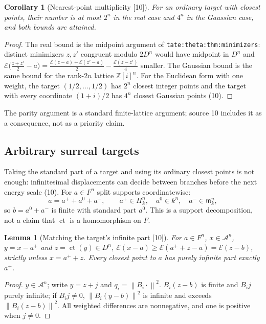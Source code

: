 \documentclass[11pt,oneside]{article}
\numberwithin{equation}{section}
\newtheorem{lemma}[lemma]{Lemma}
\newtheorem{corollary}[corollary]{Corollary}
\theoremstyle{definition}
\theoremstyle{remark}
\newcommand{\Z}{\mathbb Z}
\newcommand{\A}{\mathcal A}
\newcommand{\cE}{\mathcal E}
\newcommand{\mm}{\mathfrak m}
\newcommand{\ct}{\operatorname{ct}}
\newcommand{\norm}[1]{\left\lVert #1\right\rVert}
\newcommand{\src}[1]{\textup{\textsf{\small[#1]}}}
\newcommand{\replabel}[1]{\nolinkurl{#1}}
\begin{document}
\begin{corollary}[Nearest-point multiplicity \src{10}]\label{ogl:lat:cor:parity}
For an ordinary target with closest points, their number is at most $2^n$ in
the real case and $4^n$ in the Gaussian case, and both bounds are attained.
\end{corollary}
\begin{proof}
The real bound is the midpoint argument of \replabel{tate:theta:thm:minimizers}:
distinct minimizers $z,z'$ congruent modulo $2D^n$ would have midpoint in $D^n$
and $\cE\bigl(\frac{z+z'}2-a\bigr)=\frac{\cE(z-a)+\cE(z'-a)}2-\frac{\cE(z-z')}4$
smaller. The Gaussian bound is the same bound for the rank-$2n$ lattice
$\Z[i]^n$. For the Euclidean form with one weight, the target
$(1/2,\dots,1/2)$ has $2^n$ closest integer points and the target with every
coordinate $(1+i)/2$ has $4^n$ closest Gaussian points (10).
\end{proof}

The parity argument is a standard finite-lattice argument; source 10 includes
it as a consequence, not as a priority claim.

\subsection{Arbitrary surreal targets}

Taking the standard part of a target and using its ordinary closest points is not
enough: infinitesimal displacements can decide between branches before the next
energy scale (10). For $a\in F^n$ split supports coordinatewise:
\begin{equation}\label{ogl:lat:eq:targetsplit}
 a=a^++a^0+a^-,\qquad a^+\in\Pi_k^n,\quad a^0\in k^n,\quad a^-\in\mm_k^n,
\end{equation}
so $b=a^0+a^-$ is finite with standard part $a^0$. This is a support
decomposition, not a claim that $\ct$ is a homomorphism on $F$.

\begin{lemma}[Matching the target's infinite part \src{10}]\label{ogl:lat:lem:finitetarget}
For $a\in F^n$, $x\in\A^n$, $y=x-a^+$ and $z=\ct(y)\in D^n$,
$\cE(x-a)\ge\cE(a^++z-a)=\cE(z-b)$, strictly unless $x=a^++z$. Every closest
point to $a$ has purely infinite part exactly $a^+$.
\end{lemma}
\begin{proof}
$y\in\A^n$; write $y=z+j$ and $q_i=\norm{B_i\cdot}^2$. $B_i(z-b)$ is finite and
$B_ij$ purely infinite; if $B_ij\ne0$, $\norm{B_i(y-b)}^2$ is infinite and exceeds
$\norm{B_i(z-b)}^2$. All weighted differences are nonnegative, and one is
positive when $j\ne0$.
\end{proof}
\end{document}
